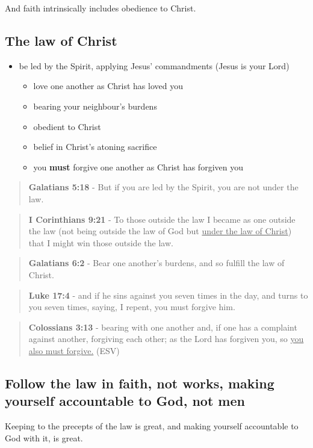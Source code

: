 \documentclass[11pt]{article}
\begin{document}
And faith intrinsically includes obedience to Christ.

\subsection{The law of Christ}
\label{sec:org42ec5ab}
\begin{itemize}
\item be led by the Spirit, applying Jesus' commandments (Jesus is your Lord)
\begin{itemize}
\item love one another as Christ has loved you
\item bearing your neighbour's burdens
\item obedient to Christ
\item belief in Christ's atoning sacrifice
\item you \textbf{must} forgive one another as Christ has forgiven you
\end{itemize}
\end{itemize}

\begin{quote}
\textbf{Galatians 5:18} - But if you are led by the Spirit, you are not under the law.
\end{quote}

\begin{quote}
\textbf{I Corinthians 9:21} - To those outside the law I became as one outside the law (not being outside the law of God but \uline{under the law of Christ}) that I might win those outside the law.
\end{quote}

\begin{quote}
\textbf{Galatians 6:2} - Bear one another's burdens, and so fulfill the law of Christ.
\end{quote}

\begin{quote}
\textbf{Luke 17:4} - and if he sins against you seven times in the day, and turns to you seven times, saying, I repent, you must forgive him.
\end{quote}

\begin{quote}
\textbf{Colossians 3:13} - bearing with one another and, if one has a complaint against another, forgiving each other; as the Lord has forgiven you, so \uline{you also must forgive.} (ESV)
\end{quote}

\subsection{Follow the law in faith, not works, making yourself accountable to God, not men}
\label{sec:org43e88f2}
Keeping to the precepts of the law is great, and making yourself accountable to God with it, is great.
\end{document}
